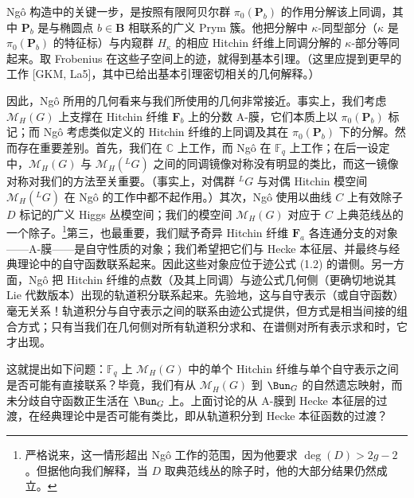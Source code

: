 Ngô 构造中的关键一步，是按照有限阿贝尔群 $\pi_0(\boldsymbol{P}_b)$ 的作用分解该上同调，其中 $\boldsymbol{P}_b$ 是与椭圆点 $b\in\boldsymbol{B}$ 相联系的广义 Prym 簇。他把分解中 $\kappa$-同型部分（$\kappa$ 是 $\pi_0(\boldsymbol{P}_b)$ 的特征标）与内窥群 $H_\kappa$ 的相应 Hitchin 纤维上同调分解的 $\kappa$-部分等同起来。取 Frobenius 在这些子空间上的迹，就得到基本引理。（这里应提到更早的工作 [GKM, La5]，其中已给出基本引理密切相关的几何解释。）


因此，Ngô 所用的几何看来与我们所使用的几何非常接近。事实上，我们考虑 $\mathcal{M}_H(G)$ 上支撑在 Hitchin 纤维 $\boldsymbol{F}_b$ 上的分数 A-膜，它们本质上以 $\pi_0(\boldsymbol{P}_b)$ 标记；而 Ngô 考虑类似定义的 Hitchin 纤维的上同调及其在 $\pi_0(\boldsymbol{P}_b)$ 下的分解。然而存在重要差别。首先，我们在 $\mathbb{C}$ 上工作，而 Ngô 在 $\mathbb{F}_q$ 上工作；在后一设定中，$\mathcal{M}_H(G)$ 与 $\mathcal{M}_H({}^{L}G)$ 之间的同调镜像对称没有明显的类比，而这一镜像对称对我们的方法至关重要。（事实上，对偶群 ${}^{L}G$ 与对偶 Hitchin 模空间 $\mathcal{M}_H({}^{L}G)$ 在 Ngô 的工作中都不起作用。）其次，Ngô 使用以曲线 $C$ 上有效除子 $D$ 标记的广义 Higgs 丛模空间；我们的模空间 $\mathcal{M}_H(G)$ 对应于 $C$ 上典范线丛的一个除子。\footnote{严格说来，这一情形超出 Ngô 工作的范围，因为他要求 $\deg(D)>2g-2$。但据他向我们解释，当 $D$ 取典范线丛的除子时，他的大部分结果仍然成立。}第三，也最重要，我们赋予奇异 Hitchin 纤维 $\boldsymbol{F}_a$ 各连通分支的对象——A-膜——是自守性质的对象；我们希望把它们与 Hecke 本征层、并最终与经典理论中的自守函数联系起来。因此这些对象应位于迹公式 (1.2) 的谱侧。另一方面，Ngô 把 Hitchin 纤维的点数（及其上同调）与迹公式几何侧（更确切地说其 Lie 代数版本）出现的轨道积分联系起来。先验地，这与自守表示（或自守函数）毫无关系！轨道积分与自守表示之间的联系由迹公式提供，但方式是相当间接的组合方式；只有当我们在几何侧对所有轨道积分求和、在谱侧对所有表示求和时，它才出现。

这就提出如下问题：$\mathbb{F}_q$ 上 $\mathcal{M}_H(G)$ 中的单个 Hitchin 纤维与单个自守表示之间是否可能有直接联系？毕竟，我们有从 $\mathcal{M}_H(G)$ 到 $\Bun_G$ 的自然遗忘映射，而未分歧自守函数正生活在 $\Bun_G$ 上。上面讨论的从 A-膜到 Hecke 本征层的过渡，在经典理论中是否可能有类比，即从轨道积分到 Hecke 本征函数的过渡？

